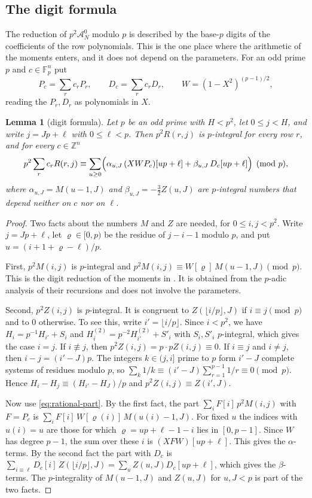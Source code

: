 \documentclass[11pt]{amsart}
\newtheorem{lemma}[theorem]{Lemma}
\theoremstyle{definition}
\theoremstyle{remark}
\numberwithin{equation}{section}
\newcommand{\Z}{\mathbb Z}
\newcommand{\F}{\mathbb F}
\newcommand{\cA}{\mathcal A}
\begin{document}
\subsection{The digit formula}
The reduction of $p^2\cA^0_N$ modulo $p$ is described by the base-$p$ digits of the coefficients of the
row polynomials. This is the one place where the arithmetic of the moments enters, and it does not depend
on the parameters. For an odd prime $p$ and $c\in\F_p^n$ put
\[
 P_c=\sum_rc_rP_r,\qquad D_c=\sum_rc_rD_r,\qquad W=(1-X^2)^{(p-1)/2},
\]
reading the $P_r,D_r$ as polynomials in $X$.

\begin{lemma}[digit formula]\label{lem:digits}
Let $p$ be an odd prime with $H<p^2$, let $0\le j<H$, and write $j=Jp+\ell$ with $0\le\ell<p$. Then
$p^2R(r,j)$ is $p$-integral for every row $r$, and for every $c\in\Z^n$
\[
 p^2\sum_rc_rR(r,j)\equiv\sum_{u\ge0}\Bigl(\alpha_{u,J}\,(XWP_c)[up+\ell]+\beta_{u,J}\,D_c[up+\ell]\Bigr)
 \pmod p ,
\]
where $\alpha_{u,J}=M(u-1,J)$ and $\beta_{u,J}=-\tfrac32Z(u,J)$ are $p$-integral numbers that depend neither
on $c$ nor on $\ell$.
\end{lemma}

\begin{proof}
Two facts about the numbers $M$ and $Z$ are needed, for $0\le i,j<p^2$. Write $j=Jp+\ell$, let
$\varrho\in[0,p)$ be the residue of $j-i-1$ modulo $p$, and put $u=(i+1+\varrho-\ell)/p$.

First, $p^2M(i,j)$ is $p$-integral and $p^2M(i,j)\equiv W[\varrho]\,M(u-1,J)\pmod p$. This is the digit
reduction of the moments in \cite[\S3]{OpenAI2026}. It is obtained from the $p$-adic analysis of their
recursions and does not involve the parameters.

Second, $p^2Z(i,j)$ is $p$-integral. It is congruent to $Z(\lfloor i/p\rfloor,J)$ if $i\equiv j\pmod p$ and
to $0$ otherwise. To see this, write $i'=\lfloor i/p\rfloor$. Since $i<p^2$, we have $H_i=p^{-1}H_{i'}+S_i$
and $H^{(2)}_i=p^{-2}H^{(2)}_{i'}+S'_i$ with $S_i,S'_i$ $p$-integral, which gives the case $i=j$. If
$i\not\equiv j$, then $p^2Z(i,j)=p\cdot pZ(i,j)\equiv0$. If $i\equiv j$ and $i\ne j$, then $i-j=(i'-J)p$. The
integers $k\in(j,i]$ prime to $p$ form $i'-J$ complete systems of residues modulo $p$, so
$\sum_k1/k\equiv(i'-J)\sum_{r=1}^{p-1}1/r\equiv0\pmod p$. Hence $H_i-H_j\equiv(H_{i'}-H_J)/p$ and
$p^2Z(i,j)\equiv Z(i',J)$.

Now use \eqref{eq:rational-part}. By the first fact, the part $\sum_iF[i]\,p^2M(i,j)$ with $F=P_c$ is
$\sum_iF[i]\,W[\varrho(i)]\,M(u(i)-1,J)$. For fixed $u$ the indices with $u(i)=u$ are those for which
$\varrho=up+\ell-1-i$ lies in $[0,p-1]$. Since $W$ has degree $p-1$, the sum over these $i$ is
$(XFW)[up+\ell]$. This gives the $\alpha$-terms. By the second fact the part with $D_c$ is
$\sum_{i\equiv\ell}D_c[i]\,Z(\lfloor i/p\rfloor,J)=\sum_uZ(u,J)D_c[up+\ell]$, which gives the $\beta$-terms.
The $p$-integrality of $M(u-1,J)$ and $Z(u,J)$ for $u,J<p$ is part of the two facts.
\end{proof}
\end{document}
